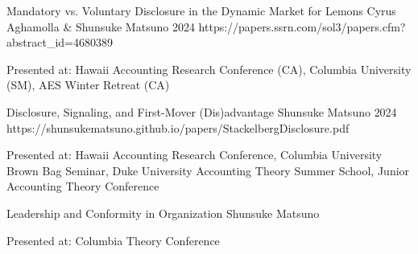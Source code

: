 


\paperentry
	{Mandatory vs. Voluntary Disclosure in the Dynamic Market for Lemons}   %
	{Cyrus Aghamolla \& Shunsuke Matsuno}   %
	{2024}   %
	{https://papers.ssrn.com/sol3/papers.cfm?abstract_id=4680389}  %
	{}   %
	{}   %
	{
	\begin{cvitems}  %
		\item {Presented at: Hawaii Accounting Research Conference (CA), Columbia University (SM), AES Winter Retreat (CA)}
	\end{cvitems}
	}

\paperentry
	{Disclosure, Signaling, and First-Mover (Dis)advantage}   %
	{Shunsuke Matsuno}   %
	{2024}
	{https://shunsukematsuno.github.io/papers/StackelbergDisclosure.pdf}  %
	{}   %
	{}   %
	{
	\begin{cvitems}  %
		\item {Presented at: Hawaii Accounting Research Conference, Columbia University Brown Bag Seminar, Duke University Accounting Theory Summer School, Junior Accounting Theory Conference}
	\end{cvitems}
	}

\vspace{.3cm}


\paperentry
	{Leadership and Conformity in Organization}
	{Shunsuke Matsuno}
	{}
	{}
	{}
	{}
	{
	\begin{cvitems} %
		\item {Presented at: Columbia Theory Conference}
	\end{cvitems}
	}





	
